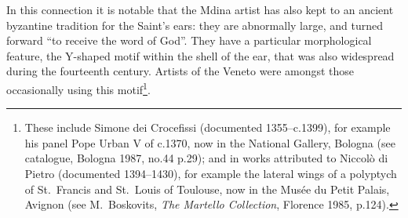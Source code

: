 \documentclass[a4paper,12pt]{article}
\begin{document}
In this connection it is notable that the Mdina artist has also kept
to an ancient byzantine tradition for the Saint's ears: they are
abnormally large, and turned forward ``to receive the word of
God''. They have a particular morphological feature, the Y-shaped
motif within the shell of the ear, that was also widespread during the
fourteenth century. Artists of the Veneto were amongst those
occasionally using this motif\footnote{These include Simone dei
Crocefissi (documented 1355--c.1399), for example his panel Pope
Urban V of c.1370, now in the National Gallery, Bologna (see
catalogue, Bologna 1987, no.44 p.29); and in works attributed to
Niccol\`o di Pietro (documented 1394--1430), for example the lateral
wings of a polyptych of St.~Francis and St.~Louis of Toulouse, now in
the Mus\'ee du Petit Palais, Avignon (see M.~Boskovits, \textit{The
Martello Collection}, Florence 1985, p.124).}.
\end{document}
